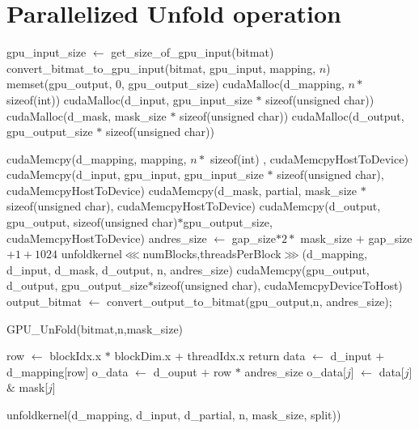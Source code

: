 \documentclass{article}
\begin{document}
\section*{Parallelized Unfold operation}

\begin{algorithm}[H]
      \begin{algorithmic}[1]
      \STATE gpu\_input\_size $\gets$ get\_size\_of\_gpu\_input(bitmat)
      \STATE convert\_bitmat\_to\_gpu\_input(bitmat, gpu\_input, mapping, $n$)
      \STATE memset(gpu\_output, 0, gpu\_output\_size)
      \STATE cudaMalloc(d\_mapping, $n *$ sizeof(int))
      \STATE cudaMalloc(d\_input, gpu\_input\_size $*$ sizeof(unsigned char))
      \STATE cudaMalloc(d\_mask, mask\_size $*$ sizeof(unsigned char))
      \STATE cudaMalloc(d\_output, gpu\_output\_size $*$ sizeof(unsigned char))
      
      \STATE cudaMemcpy(d\_mapping, mapping, $n *$ sizeof(int) , cudaMemcpyHostToDevice)
      \STATE cudaMemcpy(d\_input, gpu\_input, gpu\_input\_size $*$ sizeof(unsigned char), cudaMemcpyHostToDevice)
      \STATE cudaMemcpy(d\_mask, partial, mask\_size $*$ sizeof(unsigned char), cudaMemcpyHostToDevice)
      \STATE cudaMemcpy(d\_output, gpu\_output, sizeof(unsigned char)$*$gpu\_output\_size, cudaMemcpyHostToDevice)
      \STATE andres\_size $\gets$ gap\_size$ * 2 * $ mask\_size $+$ gap\_size $+ 1 + 1024$
      \STATE unfoldkernel$\lll$numBlocks,threadsPerBlock$\ggg$(d\_mapping, d\_input, d\_mask, d\_output, n, andres\_size)
      \STATE cudaMemcpy(gpu\_output, d\_output, gpu\_output\_size$*$sizeof(unsigned char), cudaMemcpyDeviceToHost)
      \STATE output\_bitmat $\gets$ convert\_output\_to\_bitmat(gpu\_output,n, andres\_size);
      \end{algorithmic}
      \caption{GPU\_UnFold(bitmat,n,mask\_size)}
\end{algorithm}

\begin{algorithm}[H]
      \begin{algorithmic}[1]
      \STATE row $\gets$ blockIdx.x $*$ blockDim.x $+$ threadIdx.x
            \STATE return
        \ENDIF
        \STATE data $\gets$ d\_input $+$ d\_mapping[row]
        \STATE o\_data $\gets$ d\_ouput $+$ row $*$ andres\_size
            \STATE o\_data[$j$] $\gets $ data[$j$] $\mathrel{\&}$ mask[$j$]
        \ENDFOR
      \ENDIF
      \end{algorithmic}
      \caption{unfoldkernel(d\_mapping, d\_input, d\_partial, n, mask\_size, split))}
\end{algorithm}
\end{document}
